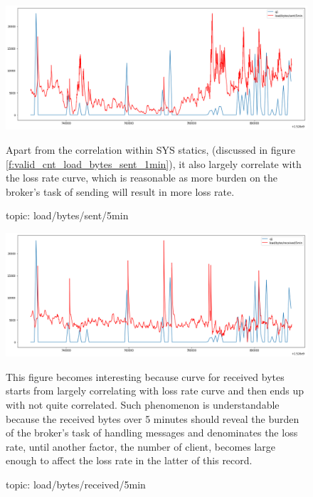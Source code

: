\documentclass[12pt, letterpaper]{article}
\begin{document}
\begin{figure}
	\setlength{\tabcolsep}{0pt}
	\caption{topic: load/bytes/sent/5min}
	\label{f:loss_cnt_load_bytes_sent_5min}
	\begin{center}
		\includegraphics[width=\textwidth]{loss_cnt/loss-load_bytes_sent_5min}      
	\end{center}
	Apart from the correlation within SYS statics, (discussed in figure \ref{f:valid_cnt_load_bytes_sent_1min}), it also largely correlate with the loss rate curve, which is reasonable as more burden on the broker's task of sending will result in more loss rate.
\end{figure}

\begin{figure}
	\setlength{\tabcolsep}{0pt}
	\caption{topic: load/bytes/received/5min}
	\label{f:loss_cnt_load_bytes_received_5min}
	\begin{center}
		\includegraphics[width=\textwidth]{loss_cnt/loss-load_bytes_received_5min}  
	\end{center}
	This figure becomes interesting because curve for received bytes starts from largely correlating with loss rate curve and then ends up with not quite correlated. Such phenomenon is understandable because the received bytes over 5 minutes should reveal the burden of the broker's task of handling messages and denominates the loss rate, until another factor, the number of client, becomes large enough to affect the loss rate in the latter of this record. 
\end{figure}
\end{document}
